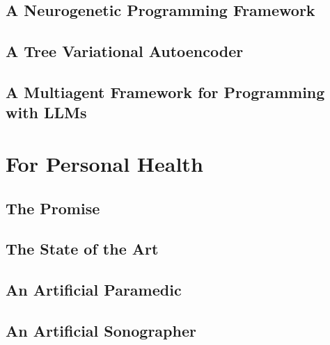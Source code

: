 \newpage
\chapter{A Neurogenetic Programming Framework \protect\cite{liventsev2021neurogenetic}}\label{ch:neurogen}


\newpage
\chapter{A Tree Variational Autoencoder \protect\cite{liventsevTreeVariationalAutoencoder}}\label{ch:tree2tree}


\newpage
\chapter{A Multiagent Framework for Programming with LLMs \protect\cite{liventsevFullyAutonomousProgramming2023}}\label{ch:seidr}


\part{For Personal Health}
\newpage
\chapter{The Promise} \label{ch:health-motiv}


\newpage
\chapter{The State of the Art} \label{ch:health-sota}


\newpage
\chapter{An Artificial Paramedic} \label{ch:virtu-als}



\newpage
\chapter{An Artificial Sonographer} \label{ch:imagym}


